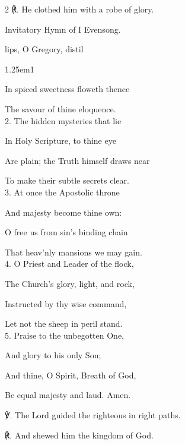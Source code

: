 \begin{paracol}{2}
	℟. He clothed him with a robe of glory.


\switchcolumn

\mattins\label{GregoryMattins}

\begin{rubric}
	Invitatory Hymn of I Evensong.
\end{rubric}

\mattinsOfficeHymn

 lips, O Gregory, distil

\begin{hangparas}{1.25em}{1}

In spiced sweetness floweth thence

The savour of thine eloquence.\\

2. The hidden mysteries that lie

In Holy Scripture, to thine eye

Are plain; the Truth himself draws near

To make their subtle secrets clear.\\

3. At once the Apostolic throne

And majesty become thine own:

O free us from sin's binding chain

That heav'nly mansions we may gain.\\

4. O Priest and Leader of the flock,

The Church's glory, light, and rock,

Instructed by thy wise command,

Let not the sheep in peril stand.\\

5. Praise to the unbegotten One,

And glory to his only Son;

And thine, O Spirit, Breath of God,

Be equal majesty and laud. Amen.\\
\end{hangparas}

    ℣. The Lord guided the righteous in right paths.

	℟. And shewed him the kingdom of God.


\fussy	
\end{paracol}

